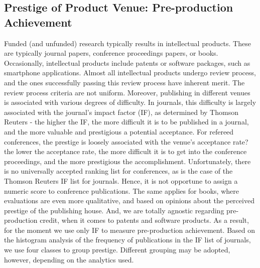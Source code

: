 
\subsection {Prestige of Product Venue: Pre-production Achievement}
Funded (and unfunded) research typically results in intellectual products. These are typically journal papers, conference proceedings papers, or books. Occasionally, intellectual products include patents or software packages, such as smartphone applications. Almost all intellectual products undergo review process, and the ones successfully passing this review process have inherent merit.  The review process criteria are not uniform. Moreover, publishing in different venues is associated with various degrees of difficulty. In journals, this difficulty is largely associated with the journal's impact factor (IF), as determined by Thomson Reuters - the higher the IF, the more difficult it is to be published in a journal, and the more valuable and prestigious a potential acceptance. For refereed conferences, the prestige is loosely associated with the venue's acceptance rate? the lower the acceptance rate, the more difficult it is to get into the conference proceedings, and the more prestigious the accomplishment. Unfortunately, there is no universally accepted ranking list for conferences, as is the case of the Thomson Reuters IF list for journals. Hence, it is not opportune to assign a numeric score to conference publications. The same applies for books, where evaluations are even more qualitative, and based on opinions about the perceived prestige of the publishing house. And, we are totally agnostic regarding pre-production credit, when it comes to patents and software products.
As a result, for the moment we use only IF to measure pre-production achievement. Based on the histogram analysis of the frequency of publications in the IF list of journals, we use four classes to group prestige. Different grouping may be adopted, however, depending on the analytics used. 

